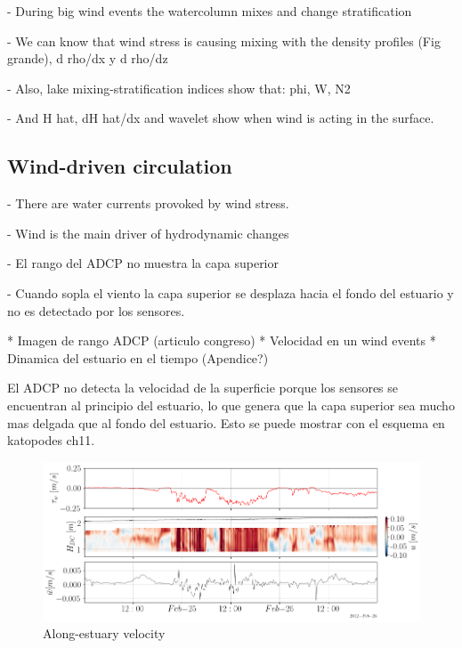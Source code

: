 \documentclass[tesis.tex]{subfiles}
\begin{document}
- During big wind events the watercolumn mixes and change stratification

- We can know that wind stress is causing mixing with the density profiles (Fig grande), d rho/dx y d rho/dz

- Also, lake mixing-stratification indices show that: phi, W, N2

- And H hat, dH hat/dx and wavelet show when wind is acting in the surface.
 
\subsection{Wind-driven circulation}

- There are water currents provoked by wind stress.

- Wind is the main driver of hydrodynamic changes

- El rango del ADCP no muestra la capa superior

- Cuando sopla el viento la capa superior se desplaza hacia el fondo del estuario y no es detectado por los sensores.

* Imagen de rango ADCP (articulo congreso)
* Velocidad en un wind events
* Dinamica del estuario en el tiempo (Apendice?)

El ADCP no detecta la velocidad de la superficie porque los sensores se encuentran al principio del estuario, lo que genera que la capa superior sea mucho mas delgada que al fondo del estuario.
Esto se puede mostrar con el esquema en katopodes ch11.




\begin{figure}[h!]
    \centering
    \includegraphics[width=\textwidth]{Imagenes/vel_wind.png}
    \caption{Along-estuary velocity }
    \label{fig:velwind}
\end{figure}
\end{document}
